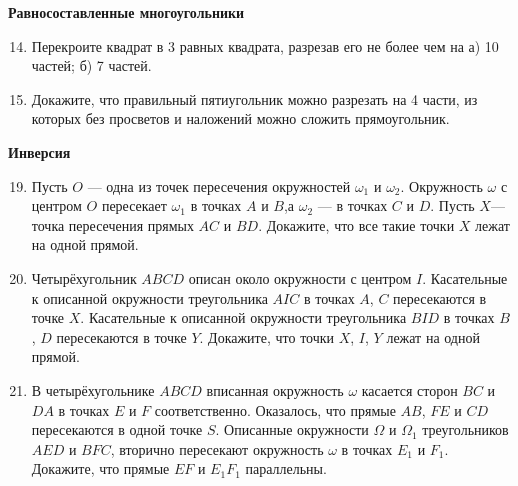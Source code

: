 \documentclass{article}
\begin{document}
	\begin{center}
		\textbf{Равносоставленные многоугольники}
	\end{center}
	
	
	\begin{enumerate}[label*=\protect\fbox{\arabic{enumi}}]
		
		\setcounter{enumi}{13}
		\item Перекроите квадрат в 3 равных квадрата, разрезав его не более чем на а) 10 частей; б) 7 частей.
		
		\setcounter{enumi}{14}
		\item Докажите, что правильный пятиугольник можно разрезать на 4 части, из которых без просветов и наложений можно сложить прямоугольник.
	\end{enumerate}
	
\begin{center}
	\textbf{Инверсия}
\end{center}

\begin{enumerate}[label*=\protect\fbox{\arabic{enumi}}]
	
	
	\setcounter{enumi}{18}
	\item Пусть $O$ — одна из точек пересечения окружностей $\omega_1$ и $\omega_2$. Окружность $\omega$ с центром $O$ пересекает $\omega_1$ в точках $A$ и $B$,а $\omega_2$ — в точках $C$ и $D$. Пусть $X$— точка пересечения прямых $AC$ и $BD$. Докажите, что все такие точки $X$ лежат на одной прямой.
	
	\setcounter{enumi}{19}
	\item Четырёхугольник $ABCD$ описан около окружности с центром $I$. Касательные к описанной окружности треугольника $AIC$ в точках $A$, $C$ пересекаются в точке $X$. Касательные к описанной окружности треугольника $BID$ в точках $B$, $D$ пересекаются в точке $Y$. Докажите, что точки $X$, $I$, $Y$ лежат на одной прямой.
	
	\setcounter{enumi}{20}
	\item В четырёхугольнике $ABCD$ вписанная окружность $\omega$ касается сторон $BC$ и $DA$ в точках $E$ и $F$ соответственно. Оказалось, что прямые $AB$, $FE$ и $CD$ пересекаются в одной точке $S$. Описанные окружности $\Omega$ и $\Omega_1$ треугольников $AED$ и $BFC$, вторично пересекают окружность $\omega$ в точках $E_1$ и $F_1$. Докажите, что прямые $EF$ и $E_1F_1$ параллельны.
	
\end{enumerate}
	
	
\end{document}
